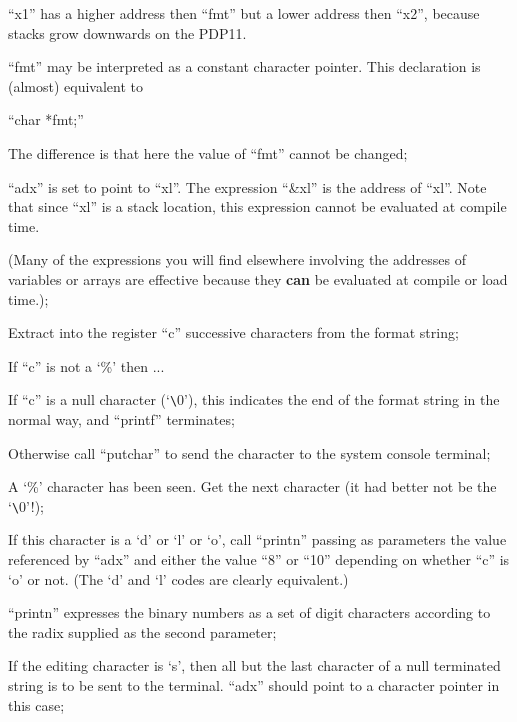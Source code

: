 ``x1'' has a higher address then ``fmt''
but a lower address then ``x2'', because
stacks grow downwards on the PDP11.

\bd
\item[2341:] ``fmt'' may be interpreted as a
 constant character pointer. This
 declaration is (almost)
 equivalent to

 ``char *fmt;''

The difference is that here the
value of ``fmt'' cannot be changed;

\item[2346:] ``adx'' is set to point to ``xl''.
 The expression ``\&xl'' is the
 address of ``xl''. Note that since
 ``xl'' is a stack location, this
 expression cannot be evaluated at
 compile time.

(Many of the expressions you will
find elsewhere involving the
addresses of variables or arrays
are effective because they {\bf can} be
evaluated at compile or load
time.);

\item[2348:] Extract into the register ``c''
 successive characters from the
 format string;

\item[2349:] If ``c'' is not a `\%' then ...

\item[2350:] If ``c'' is a null character
 (`\verb+\+0'), this indicates the end of
 the format string in the normal
 way, and ``printf'' terminates;

\item[2351:] Otherwise call ``putchar'' to send
 the character to the system console terminal;

\item[2353:] A `\%' character has been seen.
 Get the next character (it had
 better not be the `\verb+\+0'!);

\item[2354:] If this character is a `d' or `l'
 or `o', call ``printn'' passing as
 parameters the value referenced
 by ``adx'' and either the value ``8''
 or ``10'' depending on whether ``c''
 is `o' or not. (The `d' and `l'
 codes are clearly equivalent.)

``printn'' expresses the binary
numbers as a set of digit characters according to the radix 
supplied as the second parameter;

\item[2356:] If the editing character is `s',
 then all but the last character
 of a null terminated string is to
 be sent to the terminal. ``adx''
 should point to a character
 pointer in this case;

